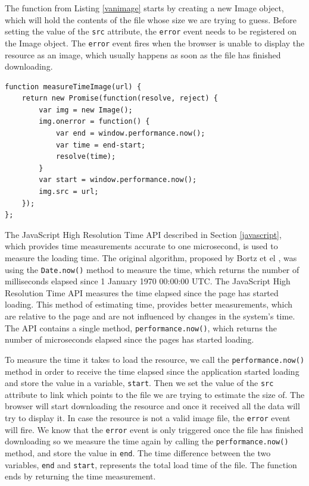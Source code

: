 \documentclass[10pt,a4paper,twoside]{book}
\begin{document}
The function from Listing \ref{vanimage} starts by creating a new Image object, which will hold the contents of the file whose size we are trying to guess. Before setting the value of the \texttt{src} attribute, the \texttt{error} event needs to be registered on the Image object. The \texttt{error} event fires when the browser is unable to display the resource as an image, which usually happens as soon as the file has finished downloading. 

\begin{lstlisting}[caption={Measuring the load time of an external resource as an Image},label={vanimage}]
function measureTimeImage(url) {
    return new Promise(function(resolve, reject) {
        var img = new Image();
        img.onerror = function() {
            var end = window.performance.now();
            var time = end-start;
            resolve(time);
        }
        var start = window.performance.now();
        img.src = url;
    });
};
\end{lstlisting}

The JavaScript High Resolution Time API described in Section \ref{javascript}, which provides time measurements accurate to one microsecond, is used to measure the loading time. The original algorithm, proposed by Bortz et el \cite{bortz2007exposing}, was using the \texttt{Date.now()} \cite{datenow} method to measure the time, which returns the number of milliseconds elapsed since 1 January 1970 00:00:00 UTC. The JavaScript High Resolution Time API measures the time elapsed since the page has started loading. This method of estimating time, provides better measurements, which are relative to the page and are not influenced by changes in the system's time. The API contains a single method, \texttt{performance.now()}, which returns the number of microseconds elapsed since the pages has started loading.

To measure the time it takes to load the resource, we call the \texttt{performance.now()} method in order to receive the time elapsed since the application started loading and store the value in a variable, \texttt{start}. Then we set the value of the \texttt{src} attribute to link which points to the file we are trying to estimate the size of. The browser will start downloading the resource and once it received all the data will try to display it. In case the resource is not a valid image file, the \texttt{error} event will fire. We know that the \texttt{error} event is only triggered once the file has finished downloading so we measure the time again by calling the \texttt{performance.now()} method, and store the value in \texttt{end}. The time difference between the two variables, \texttt{end} and \texttt{start}, represents the total load time of the file. The function ends by returning the time measurement.
\end{document}
